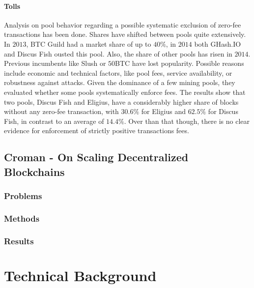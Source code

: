 \documentclass[USenglish]{uit-thesis}
\begin{document}
\subsubsection{Tolls}
Analysis on pool behavior regarding a possible systematic
exclusion of zero-fee transactions has been done.
Shares have shifted between pools quite extensively.
In $2013$, BTC Guild had a market share of up to $40\%$,
in $2014$ both GHash.IO and Discus Fish ousted this pool.
Also, the share of other pools has risen in $2014$. Previous
incumbents like Slush or $50$BTC have lost popularity.
Possible reasons include economic and technical factors,
like pool fees, service availability, or robustness against
attacks. Given the dominance of a few mining pools, they
evaluated whether some pools systematically enforce fees.
The results show that two pools, Discus Fish and Eligius,
have a considerably higher share of blocks without any
zero-fee transaction, with $30.6\%$ for Eligius and $62.5\%$
for Discus Fish, in contrast to an average of $14.4\%$.
Over than that though, there is no clear evidence for
enforcement of strictly positive transactions fees.
 
\section{Croman - On Scaling Decentralized Blockchains}
\label{sec:croman}
\subsection{Problems}

\subsection{Methods}

\subsection{Results}

\chapter{Technical Background}
\label{chap:techback}
\end{document}

